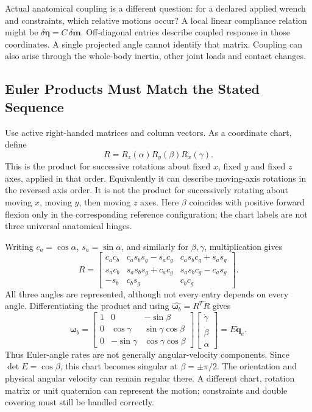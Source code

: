 Actual anatomical coupling is a different question: for a declared applied wrench and constraints, which relative motions occur? A local linear compliance relation might be $\delta\bm\eta=C\,\delta\bm m$. Off-diagonal entries describe coupled response in those coordinates. A single projected angle cannot identify that matrix. Coupling can also arise through the whole-body inertia, other joint loads and contact changes.

\subsection{Euler Products Must Match the Stated Sequence}
Use active right-handed matrices and column vectors. As a coordinate chart, define
\begin{equation}
R=R_z(\alpha)R_y(\beta)R_x(\gamma).
\end{equation}
This is the product for successive rotations about fixed $x$, fixed $y$ and fixed $z$ axes, applied in that order. Equivalently it can describe moving-axis rotations in the reversed axis order. It is not the product for successively rotating about moving $x$, moving $y$, then moving $z$ axes. Here $\beta$ coincides with positive forward flexion only in the corresponding reference configuration; the chart labels are not three universal anatomical hinges.

Writing $c_a=\cos\alpha$, $s_a=\sin\alpha$, and similarly for $\beta,\gamma$, multiplication gives
\begin{equation}
R=\begin{bmatrix}
c_a c_b & c_a s_b s_g-s_a c_g & c_a s_b c_g+s_a s_g\\
s_a c_b & s_a s_b s_g+c_a c_g & s_a s_b c_g-c_a s_g\\
-s_b & c_b s_g & c_b c_g
\end{bmatrix}.
\label{eq:euler_angles}
\end{equation}
All three angles are represented, although not every entry depends on every angle. Differentiating the product and using $\widehat{\bm\omega_b}=R^T\dot R$ gives
\begin{equation}
\bm\omega_b=
\begin{bmatrix}
1&0&-\sin\beta\\
0&\cos\gamma&\sin\gamma\cos\beta\\
0&-\sin\gamma&\cos\gamma\cos\beta
\end{bmatrix}
\begin{bmatrix}\dot\gamma\\\dot\beta\\\dot\alpha\end{bmatrix}
=E\dot{\bm q}_e.
\end{equation}
Thus Euler-angle rates are not generally angular-velocity components. Since $\det E=\cos\beta$, this chart becomes singular at $\beta=\pm\pi/2$. The orientation and physical angular velocity can remain regular there. A different chart, rotation matrix or unit quaternion can represent the motion; constraints and double covering must still be handled correctly.

